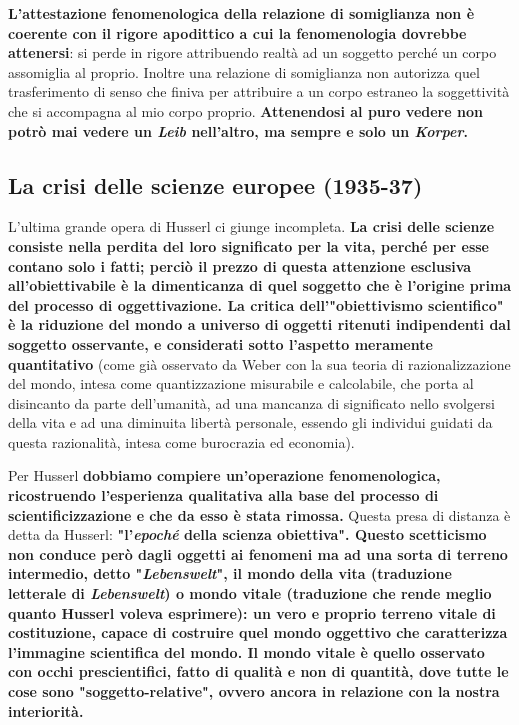 \textbf{L'attestazione fenomenologica della relazione di
somiglianza non è coerente con il rigore
apodittico a cui la fenomenologia dovrebbe
attenersi}: si perde in rigore attribuendo realtà
ad un soggetto perché un corpo assomiglia
al proprio. Inoltre una relazione di somiglianza
non autorizza quel trasferimento di senso che
finiva per attribuire a un corpo estraneo
la soggettività che si accompagna al mio corpo
proprio. \textbf{Attenendosi al puro vedere non potrò mai
vedere un \textit{Leib} nell'altro, ma sempre e solo un \textit{Korper}.}

\subsection{La crisi delle scienze europee (1935-37)}

L'ultima grande opera di Husserl ci giunge incompleta.
\textbf{La crisi delle scienze consiste nella perdita del loro
significato per la vita, perché per esse contano solo
i fatti; perciò il prezzo di questa attenzione esclusiva
all'obiettivabile è la dimenticanza di quel soggetto
che è l'origine prima del processo di oggettivazione.
La critica dell'"obiettivismo scientifico" è la riduzione
del mondo a universo di oggetti ritenuti indipendenti dal soggetto osservante, e considerati sotto
l'aspetto meramente quantitativo} (come già osservato da Weber con la sua teoria di razionalizzazione del mondo, intesa come quantizzazione misurabile e calcolabile, che porta al disincanto da parte dell'umanità,  ad una mancanza di significato nello svolgersi della vita e ad una diminuita libertà personale, essendo gli individui guidati da questa razionalità, intesa come burocrazia ed economia).

Per Husserl \textbf{dobbiamo compiere un'operazione fenomenologica,
ricostruendo l'esperienza qualitativa alla base del
processo di scientificizzazione e che da esso è stata
rimossa.} Questa presa di distanza è detta da Husserl:
\textbf{"l'\textit{epoché} della scienza obiettiva".
Questo scetticismo non conduce però dagli oggetti
ai fenomeni ma ad una sorta di terreno intermedio,
detto "\textit{Lebenswelt}", il mondo della vita (traduzione letterale di \textit{Lebenswelt}) o mondo
vitale (traduzione che rende meglio quanto Husserl voleva esprimere): un vero e proprio terreno vitale di costituzione,
capace di costruire quel mondo oggettivo che caratterizza
l'immagine scientifica del mondo.
Il mondo vitale è quello osservato con occhi
prescientifici, fatto di qualità e non di quantità,
dove tutte le cose sono "soggetto-relative",
ovvero ancora in relazione con la nostra interiorità.}

